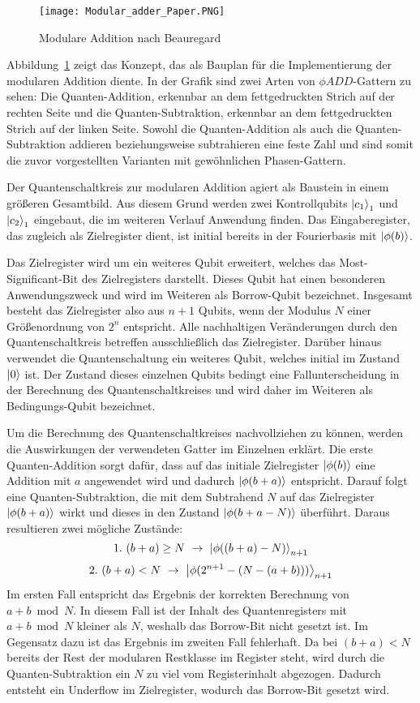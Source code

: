 \begin{figure}[H]
  \centering
  \texttt{[image: Modular\_adder\_Paper.PNG]}
  \caption{Modulare Addition nach Beauregard~\cite{beauregard2003circuit}}
  \label{fig:modulare_addition_paper}
\end{figure}
Abbildung~\ref{fig:modulare_addition_paper} zeigt das Konzept, 
das als Bauplan für die Implementierung der modularen Addition diente.
In der Grafik sind zwei Arten von \(\phi ADD\)-Gattern zu sehen:
Die Quanten-Addition, erkennbar an dem fettgedruckten Strich auf der rechten Seite 
und die Quanten-Subtraktion, erkennbar an dem fettgedruckten Strich auf der linken Seite.
Sowohl die Quanten-Addition als auch die Quanten-Subtraktion addieren beziehungsweise subtrahieren eine feste Zahl und 
sind somit die zuvor vorgestellten Varianten mit gewöhnlichen Phasen-Gattern.

Der Quantenschaltkreis zur modularen Addition agiert als Baustein in einem größeren Gesamtbild. 
Aus diesem Grund werden zwei Kontrollqubits \(\ket{c_1}_1\) und \(\ket{c_2}_1\) eingebaut, 
die im weiteren Verlauf Anwendung finden.
Das Eingaberegister, das zugleich als Zielregister dient,  
ist initial bereits in der Fourierbasis mit \(\ket{\phi(b)}\).

Das Zielregister wird um ein weiteres Qubit erweitert, 
welches das Most-Significant-Bit des Zielregisters darstellt.
Dieses Qubit hat einen besonderen Anwendungszweck und wird im Weiteren als Borrow-Qubit bezeichnet.
Insgesamt besteht das Zielregister also aus \(n+1\) Qubits, 
wenn der Modulus \(N\) einer Größenordnung von \(2^n\) entspricht.
Alle nachhaltigen Veränderungen durch den Quantenschaltkreis betreffen ausschließlich das Zielregister.
Darüber hinaus verwendet die Quantenschaltung ein weiteres Qubit, 
welches initial im Zustand \(\ket{0}\) ist.
Der Zustand dieses einzelnen Qubits bedingt eine Fallunterscheidung in der Berechnung des Quantenschaltkreises und 
wird daher im Weiteren als Bedingungs-Qubit bezeichnet. 

Um die Berechnung des Quantenschaltkreises nachvollziehen zu können, 
werden die Auswirkungen der verwendeten Gatter im Einzelnen erklärt.
Die erste Quanten-Addition sorgt dafür, 
dass auf das initiale Zielregister \(\ket{\phi(b)}\) eine Addition mit \(a\) angewendet wird und 
dadurch \(\ket{\phi(b + a)}\) entspricht.
Darauf folgt eine Quanten-Subtraktion, 
die mit dem Subtrahend \(N\) auf das Zielregister \(\ket{\phi(b + a)}\) wirkt und 
dieses in den Zustand \(\ket{\phi(b + a - N)}\) überführt. 
Daraus resultieren zwei mögliche Zustände:
\[1.~(b+a) \geq N~\rightarrow~\ket{\phi((b+a) - N)}_{n+1}\]
\[2.~
(b+a) < N~\rightarrow~\ket{\phi(2^{n+1}-(N-(a+b)))}_{n+1}
  \]
Im ersten Fall entspricht das Ergebnis der korrekten Berechnung von \(a+b \bmod N\).
In diesem Fall ist der Inhalt des Quantenregisters mit \(a+b \bmod N\) kleiner als \(N\), 
weshalb das Borrow-Bit nicht gesetzt ist.
Im Gegensatz dazu ist das Ergebnis im zweiten Fall fehlerhaft.
Da bei \((b+a) < N\) bereits der Rest der modularen Restklasse im Register steht, 
wird durch die Quanten-Subtraktion ein \(N\) zu viel vom Registerinhalt abgezogen.
Dadurch entsteht ein Underflow im Zielregister, 
wodurch das Borrow-Bit gesetzt wird.

